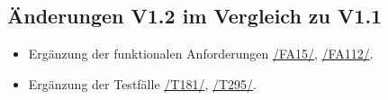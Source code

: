 \subsection*{Änderungen V1.2 im Vergleich zu V1.1}

\begin{itemize}
    \item Ergänzung der funktionalen Anforderungen \hyperref[/FA15/]{/FA15/}, \hyperref[/FA112/]{/FA112/}.
    \item Ergänzung der Testfälle \hyperref[/T181/]{/T181/}, \hyperref[/T295/]{/T295/}.
\end{itemize}
